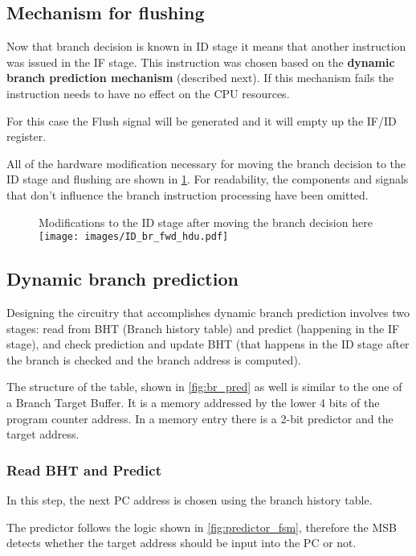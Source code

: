 \documentclass[a4paper,12pt]{report}
\begin{document}
\subsection{Mechanism for flushing}
Now that branch decision is known in ID stage it means that another instruction was issued in the IF stage. This instruction was chosen based on the \textbf{dynamic branch prediction mechanism} (described next). If this mechanism fails the instruction needs to have no effect on the CPU resources.

For this case the Flush signal will be generated and it will empty up the IF/ID register.

All of the hardware modification necessary for moving the branch decision to the ID stage and flushing are shown in \ref{fig:br_fwd_hdu}. For readability, the components and signals that don't influence the branch instruction processing have been omitted.

\begin{figure}[]
\begin{my-figure}{Modifications to the ID stage after moving the branch decision here}
        \centering
        \texttt{[image: images/ID\_br\_fwd\_hdu.pdf]}
        \label{fig:br_fwd_hdu}
\end{my-figure}
\end{figure}

\subsection{Dynamic branch prediction}
Designing the circuitry that accomplishes dynamic branch prediction involves two stages: read from BHT (Branch history table) and predict (happening in the IF stage), and check prediction and update BHT (that happens in the ID stage after the branch is checked and the branch address is computed).

The structure of the table, shown in \ref{fig:br_pred} as well is similar to the one of a Branch Target Buffer. It is a memory addressed by the lower 4 bits of the program counter address. In a memory entry there is a 2-bit predictor and the target address.

\subsubsection{Read BHT and Predict}
In this step, the next PC address is chosen using the branch history table.

The predictor follows the logic shown in \ref{fig:predictor_fsm}, therefore the MSB detects whether the target address should be input into the PC or not.
\end{document}
